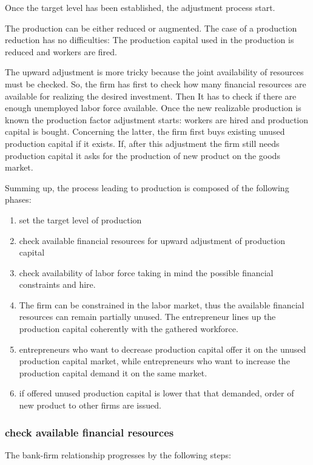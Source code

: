 \documentclass{article}
\begin{document}
Once the target level has been established, the adjustment process start. 

The production can be either reduced or augmented. The case of a production reduction has no difficulties: The production capital used in the production is reduced and workers are fired.

The upward adjustment is more tricky because the joint availability of resources must be checked.
So, the firm has first to check how many financial resources are available for realizing the desired investment. Then It has to check if there are enough unemployed labor force available. Once the new realizable production is known the production factor adjustment starts: workers are hired and production capital is bought. Concerning the latter, the firm first buys existing unused production capital if it exists. If, after this adjustment the firm still needs production capital it asks for the production of new product on the goods market.

Summing up, the process leading to production is composed of the following phases:
\begin{enumerate}
	\item set the target level of production
	\item check available financial resources for upward adjustment of production capital
	\item check availability of labor force taking in mind the possible financial constraints and hire.
	\item The firm can be constrained in the labor market, thus the available financial resources can remain partially unused. The entrepreneur lines up the production capital coherently with the gathered workforce.  
	\item entrepreneurs who want to decrease production capital offer it on the unused production capital market, while entrepreneurs who want to increase the production capital demand it on the same market. 
	\item if offered unused production capital is lower that that demanded, order of new product to other firms are issued. 
\end{enumerate}

\subsubsection{check available financial resources}
The bank-firm relationship progresses by the following steps:
\end{document}
